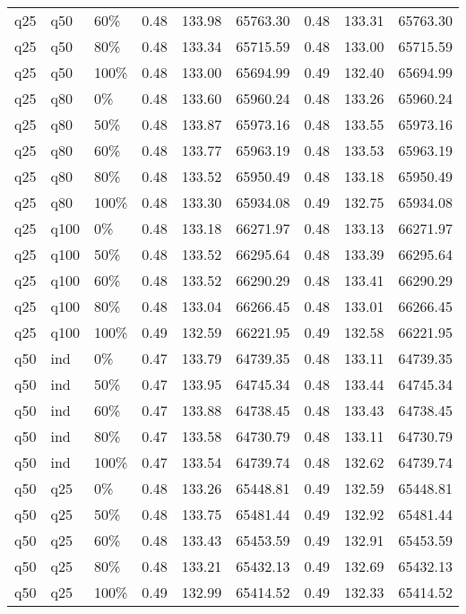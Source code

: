 \begin{longtable}{lllrrrrrr}
  q25 & q50 & 60\% & 0.48 & 133.98 & 65763.30 & 0.48 & 133.31 & 65763.30 \\ 
  q25 & q50 & 80\% & 0.48 & 133.34 & 65715.59 & 0.48 & 133.00 & 65715.59 \\ 
  q25 & q50 & 100\% & 0.48 & 133.00 & 65694.99 & 0.49 & 132.40 & 65694.99 \\ 
  q25 & q80 & 0\% & 0.48 & 133.60 & 65960.24 & 0.48 & 133.26 & 65960.24 \\ 
  q25 & q80 & 50\% & 0.48 & 133.87 & 65973.16 & 0.48 & 133.55 & 65973.16 \\ 
  q25 & q80 & 60\% & 0.48 & 133.77 & 65963.19 & 0.48 & 133.53 & 65963.19 \\ 
  q25 & q80 & 80\% & 0.48 & 133.52 & 65950.49 & 0.48 & 133.18 & 65950.49 \\ 
  q25 & q80 & 100\% & 0.48 & 133.30 & 65934.08 & 0.49 & 132.75 & 65934.08 \\ 
  q25 & q100 & 0\% & 0.48 & 133.18 & 66271.97 & 0.48 & 133.13 & 66271.97 \\ 
  q25 & q100 & 50\% & 0.48 & 133.52 & 66295.64 & 0.48 & 133.39 & 66295.64 \\ 
  q25 & q100 & 60\% & 0.48 & 133.52 & 66290.29 & 0.48 & 133.41 & 66290.29 \\ 
  q25 & q100 & 80\% & 0.48 & 133.04 & 66266.45 & 0.48 & 133.01 & 66266.45 \\ 
  q25 & q100 & 100\% & 0.49 & 132.59 & 66221.95 & 0.49 & 132.58 & 66221.95 \\ 
  q50 & ind & 0\% & 0.47 & 133.79 & 64739.35 & 0.48 & 133.11 & 64739.35 \\ 
  q50 & ind & 50\% & 0.47 & 133.95 & 64745.34 & 0.48 & 133.44 & 64745.34 \\ 
  q50 & ind & 60\% & 0.47 & 133.88 & 64738.45 & 0.48 & 133.43 & 64738.45 \\ 
  q50 & ind & 80\% & 0.47 & 133.58 & 64730.79 & 0.48 & 133.11 & 64730.79 \\ 
  q50 & ind & 100\% & 0.47 & 133.54 & 64739.74 & 0.48 & 132.62 & 64739.74 \\ 
  q50 & q25 & 0\% & 0.48 & 133.26 & 65448.81 & 0.49 & 132.59 & 65448.81 \\ 
  q50 & q25 & 50\% & 0.48 & 133.75 & 65481.44 & 0.49 & 132.92 & 65481.44 \\ 
  q50 & q25 & 60\% & 0.48 & 133.43 & 65453.59 & 0.49 & 132.91 & 65453.59 \\ 
  q50 & q25 & 80\% & 0.48 & 133.21 & 65432.13 & 0.49 & 132.69 & 65432.13 \\ 
  q50 & q25 & 100\% & 0.49 & 132.99 & 65414.52 & 0.49 & 132.33 & 65414.52 \\ 

\end{longtable}
